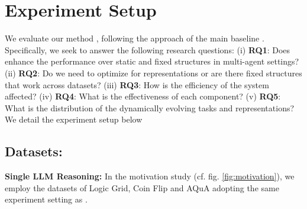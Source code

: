 \section{Experiment Setup}
We evaluate our method \method, following the approach of the main baseline \cite{chen-etal-2024-beyond-natural}. 
Specifically, we seek to answer the following research questions:
(i) \textbf{RQ1}: Does \method enhance the performance over static and fixed structures in multi-agent settings?
(ii) \textbf{RQ2}: Do we need to optimize for representations or are there fixed structures that work across datasets?
(iii) \textbf{RQ3}: How is the efficiency of the system affected?
(iv) \textbf{RQ4}: What is the effectiveness of each component?
(v) \textbf{RQ5}: What is the distribution of the dynamically evolving tasks and representations?
We detail the experiment setup below

\subsection{Datasets:}
\noindent \textbf{Single LLM Reasoning:} In the motivation study (cf. fig. \ref{fig:motivation}), we employ the datasets of Logic Grid, Coin Flip and AQuA adopting the same experiment setting as \cite{chen-etal-2024-beyond-natural}. 

